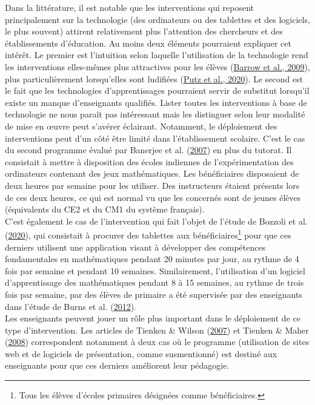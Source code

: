 \documentclass[
]{book}
\begin{document}
Dans la littérature, il est notable que les interventions qui reposent principalement sur la technologie (des ordinateurs ou des tablettes et des logiciels, le plus souvent) attirent relativement plus l'attention des chercheurs et des établissements d'éducation. Au moins deux éléments pourraient expliquer cet intérêt. Le premier est l'intuition selon laquelle l'utilisation de la technologie rend les interventions elles-mêmes plus attractives pour les élèves (\protect\hyperlink{ref-BAR:eal:09}{Barrow et al., 2009}), plus particulièrement lorsqu'elles sont ludifiées (\protect\hyperlink{ref-PUT:eal:20}{Putz et al., 2020}). Le second est le fait que les technologies d'apprentissages pourraient servir de substitut lorsqu'il existe un manque d'enseignants qualifiés.
Lister toutes les interventions à base de technologie ne nous paraît pas intéressant mais les distinguer selon leur modalité de mise en œuvre peut s'avérer éclairant. Notamment, le déploiement des interventions peut d'un côté être limité dans l'établissement scolaire. C'est le cas du second programme évalué par Banerjee et al. (\protect\hyperlink{ref-BAN:eal:07}{2007}) en plus du tutorat. Il consistait à mettre à disposition des écoles indiennes de l'expérimentation des ordinateurs contenant des jeux mathématiques. Les bénéficiaires disposaient de deux heures par semaine pour les utiliser. Des instructeurs étaient présents lors de ces deux heures, ce qui est normal vu que les concernés sont de jeunes élèves (équivalents du CE2 et du CM1 du système français).\\
C'est également le cas de l'intervention qui fait l'objet de l'étude de Bozzoli et al. (\protect\hyperlink{ref-BOZ:eal:20}{2020}), qui consistait à procurer des tablettes aux bénéficiaires\footnote{Tous les élèves d'écoles primaires désignées comme bénéficiaires.} pour que ces derniers utilisent une application visant à développer des compétences fondamentales en mathématiques pendant 20 minutes par jour, au rythme de 4 fois par semaine et pendant 10 semaines. Similairement, l'utilisation d'un logiciel d'apprentissage des mathématiques pendant 8 à 15 semaines, au rythme de trois fois par semaine, par des élèves de primaire a été supervisée par des enseignants dans l'étude de Burns et al. (\protect\hyperlink{ref-BUR:eal:12}{2012}).\\
Les enseignants peuvent jouer un rôle plus important dans le déploiement de ce type d'intervention. Les articles de Tienken \& Wilson (\protect\hyperlink{ref-TIE:WIL:07}{2007}) et Tienken \& Maher (\protect\hyperlink{ref-TIE:MAH:08}{2008}) correspondent notamment à deux cas où le programme (utilisation de sites web et de logiciels de présentation, comme susmentionné) est destiné aux enseignants pour que ces derniers améliorent leur pédagogie.
\end{document}

